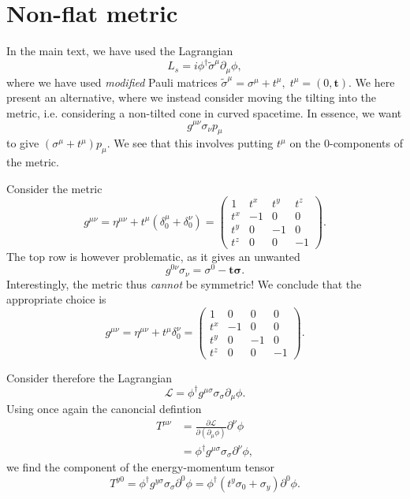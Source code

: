 \documentclass{scrarticle}
\renewcommand\vec\bm
\begin{document}
\section{Non-flat metric}
In the main text, we have used the Lagrangian
\begin{equation}
  \label{eq:1}
  L_s = i \phi^{\dagger} \tilde{\sigma} ^{\mu} \partial_{\mu} \phi,
\end{equation}
where we have used \emph{modified} Pauli matrices \( \tilde{\sigma} ^{\mu}= \sigma^{\mu} + t^{\mu}, \; t^{\mu} = (0, \vec{t}) \).
We here present an alternative, where we instead consider moving the tilting into the metric, i.e. considering a non-tilted cone in curved spacetime.
In essence, we want
\[
g^{\mu \nu} \sigma_{\nu} p_{\mu}
\]
to give \( (\sigma^{\mu} + t^{\mu}) p_{\mu} \).
We see that this involves putting \( t^{\mu} \) on the 0-components of the metric.

Consider the metric
\begin{equation}
  \label{eq:2}
  g^{\mu \nu} = \eta^{\mu \nu } + t^{\mu} (\delta^{\mu}_0 + \delta^{\nu}_0) =
  \begin{pmatrix}
    1 & t^x & t^y & t^z\\
    t^x & -1 & 0 &0\\
    t^y & 0 & -1 &0\\
    t^z & 0 & 0 &-1
  \end{pmatrix}.
\end{equation}
The top row is however problematic, as it gives an unwanted
\[
g^{0 \nu} \sigma_{\nu} = \sigma^0 - \vec{t} \vec{\sigma}.
\]
Interestingly, the metric thus \emph{cannot} be symmetric!
We conclude that the appropriate choice is
\begin{equation}
  \label{eq:3}
  g^{\mu \nu} = \eta^{\mu \nu } + t^{\mu} \delta^{\nu}_0 =
  \begin{pmatrix}
    1 & 0 & 0 & 0\\
    t^x & -1 & 0 &0\\
    t^y & 0 & -1 &0\\
    t^z & 0 & 0 &-1
  \end{pmatrix}.
\end{equation}

Consider therefore the Lagrangian
\begin{equation}
  \label{eq:4}
  \mathcal{L} = \phi^{\dagger} g^{\mu \sigma} \sigma_{\sigma} \partial_{\mu} \phi.
\end{equation}
Using once again the canoncial defintion
\begin{align}
  \label{eq:5}
  T^{\mu \nu} &= \frac{\partial \mathcal{L}}{\partial(\partial_{\mu}\phi)} \partial^{\nu} \phi\\
  &= \phi^{\dagger} g^{\mu \sigma} \sigma_{\sigma} \partial^{\nu} \phi,
\end{align}
we find the component of the energy-momentum tensor
\begin{equation}
  \label{eq:6}
  T^{y 0} = \phi^{\dagger} g^{y \sigma} \sigma_{\sigma} \partial^0 \phi =
  \phi^{\dagger} (t^y \sigma_0 + \sigma_y) \partial^0 \phi.
\end{equation}
\end{document}
